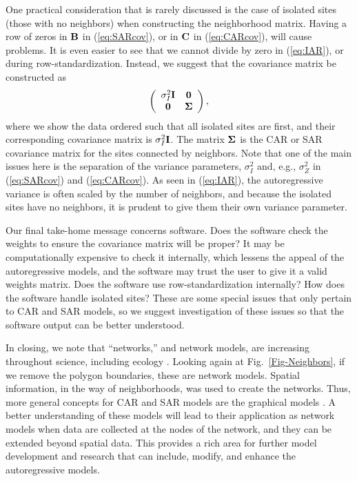 \documentclass[11pt, titlepage]{article}\usepackage[]{graphicx}\usepackage[]{color}
\begin{document}
One practical consideration that is rarely discussed is the case of isolated sites (those with no neighbors) when constructing the neighborhood matrix.  Having a row of zeros in $\mathbf{B}$ in (\ref{eq:SARcov}), or in $\mathbf{C}$ in (\ref{eq:CARcov}), will cause problems.  It is even easier to see that we cannot divide by zero in (\ref{eq:IAR}), or during row-standardization.  Instead, we suggest that the covariance matrix be constructed as
\[
	\left(
	\begin{array}{cc}
			\sigma^2_I \mathbf{I} & \mathbf{0} \\
					\mathbf{0} & \mbox{\boldmath $\Sigma$}
	\end{array}
	\right),
\]
where we show the data ordered such that all isolated sites are first, and their corresponding covariance matrix is $\sigma^2_I\mathbf{I}$.  The matrix $\mbox{\boldmath $\Sigma$}$ is the CAR or SAR covariance matrix for the sites connected by neighbors.  Note that one of the main issues here is the separation of the variance parameters, $\sigma^2_I$ and, e.g., $\sigma^2_Z$ in (\ref{eq:SARcov}) and (\ref{eq:CARcov}).  As seen in (\ref{eq:IAR}), the autoregressive variance is often scaled by the number of neighbors, and because the isolated sites have no neighbors, it is prudent to give them their own variance parameter. 

Our final take-home message concerns software. Does the software check the weights to ensure the covariance matrix will be proper?  It may be computationally expensive to check it internally, which lessens the appeal of the autoregressive models, and the software may trust the user to give it a valid weights matrix. Does the software use row-standardization internally?  How does the software handle isolated sites?  These are some special issues that only pertain to CAR and SAR models, so we suggest investigation of these issues so that the software output can be better understood.

In closing, we note that ``networks,'' and network models, are increasing throughout science, including ecology \citep{Borr:Mood:Edel:rise:2014}.  Looking again at Fig.~\ref{Fig-Neighbors}, if we remove the polygon boundaries, these are network models.  Spatial information, in the way of neighborhoods, was used to create the networks.  Thus, more general concepts for CAR and SAR models are the graphical models \citep{Laur:grap:1996, Whit:grap:2009}.  A better understanding of these models will lead to their application as network models when data are collected at the nodes of the network, and they can be extended beyond spatial data. This provides a rich area for further model development and research that can include, modify, and enhance the autoregressive models.
\end{document}

